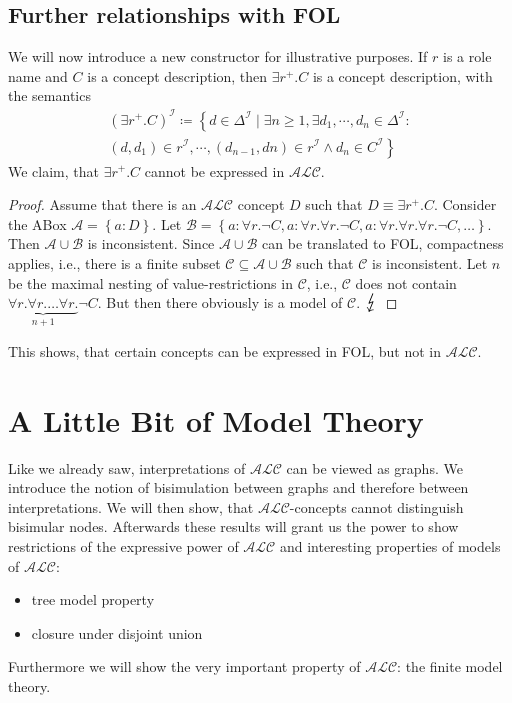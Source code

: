 \section{Further relationships with FOL}
We will now introduce a new constructor for illustrative purposes.
If $r$ is a role name and $C$ is a concept description, then $\exists r^+.C $
is a concept description, with the semantics
\[
\begin{split}
	(\exists r^+.C)^\mathcal{I} \coloneqq \left\{ d \in \Delta^{\mathcal{I}} \mid \exists n \geq 1, \exists d_1,\cdots, d_n \in \Delta^\mathcal{I} : \right.\\
		\left. (d,d_1) \in r^\mathcal{I}, \cdots, (d_{n-1},dn) \in r^\mathcal{I} \land d_n \in C^\mathcal{I}\right\}
\end{split}
\]
We claim, that $\exists r^+.C$ cannot be expressed in $\mathcal{ALC}$.
\begin{proof}
	Assume that there is an $\mathcal{ALC}$ concept $D$ such that $D \equiv \exists r^+.C$.
	Consider the ABox $\mathcal{A} = \left\{ a:D \right\}$.
	Let $ \mathcal{B} = \left\{ a : \forall r.\neg C, a: \forall r.\forall r.\neg C, a:\forall r.\forall r.\forall r.\neg C,\ldots \right\}$.
	Then $\mathcal{A} \cup \mathcal{B}$ is inconsistent.
	Since $\mathcal{A} \cup \mathcal{B}$ can be translated to FOL, compactness applies, i.e.,
	there is a finite subset $\mathcal{C} \subseteq \mathcal{A} \cup \mathcal{B}$ such that $\mathcal{C}$ is inconsistent.
	Let $n$ be the maximal nesting of value-restrictions in $\mathcal{C}$, i.e.,
	$\mathcal{C}$ does not contain $\underbrace{\forall r. \forall r. \ldots \forall r.}_{n+1} \neg C$.
	But then there obviously is a model of $\mathcal{C}$. $\contra$
\end{proof}
This shows, that certain concepts can be expressed in FOL, but not in $\mathcal{ALC}$.

\chapter{A Little Bit of Model Theory}
Like we already saw, interpretations of $\mathcal{ALC}$ can be viewed as graphs.
We introduce the notion of bisimulation between graphs and therefore between interpretations.
We will then show, that $\mathcal{ALC}$-concepts cannot distinguish bisimular nodes.
Afterwards these results will grant us the power to show restrictions of the expressive power of $\mathcal{ALC}$ and
interesting properties of models of $\mathcal{ALC}$:
\begin{itemize}
	\item tree model property
	\item closure under disjoint union
\end{itemize}
Furthermore we will show the very important property of $\mathcal{ALC}$: the finite model theory.

